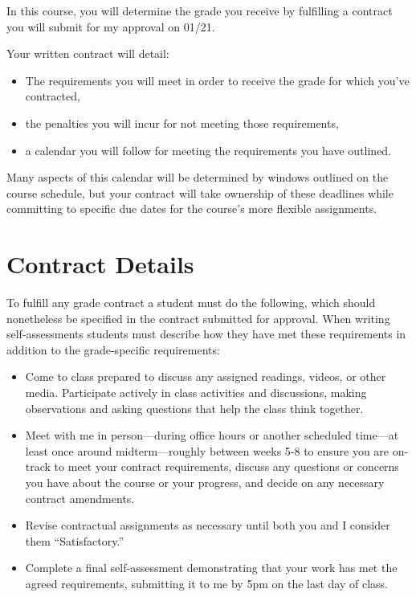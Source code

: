 In this course, you will determine the grade you receive by fulfilling a contract you will submit for my approval on 01/21.

Your written contract will detail:

\begin{itemize}
\item
  The requirements you will meet in order to receive the grade for which you've contracted,
\item
  the penalties you will incur for not meeting those requirements,
\item
  a calendar you will follow for meeting the requirements you have outlined.
\end{itemize}

Many aspects of this calendar will be determined by windows outlined on the course schedule, but your contract will take ownership of these deadlines while committing to specific due dates for the course's more flexible assignments.

\hypertarget{contract-details}{%
\section{Contract Details}\label{contract-details}}

To fulfill any grade contract a student must do the following, which should nonetheless be specified in the contract submitted for approval. When writing self-assessments students must describe how they have met these requirements in addition to the grade-specific requirements:

\begin{itemize}
\item
  Come to class prepared to discuss any assigned readings, videos, or other media. Participate actively in class activities and discussions, making observations and asking questions that help the class think together.
\item
  Meet with me in person---during office hours or another scheduled time---at least once around midterm---roughly between weeks 5-8 to ensure you are on-track to meet your contract requirements, discuss any questions or concerns you have about the course or your progress, and decide on any necessary contract amendments.
\item
  Revise contractual assignments as necessary until both you and I consider them ``Satisfactory.''
\item
  Complete a final self-assessment demonstrating that your work has met the agreed requirements, submitting it to me by 5pm on the last day of class.
\end{itemize}

